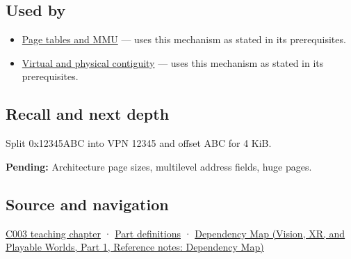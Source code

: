 \subsection{Used by}\label{appendix-0c67cd5bf30a-used-by}

\hypertarget{appendix-0c67cd5bf30a-used-by}{}

\begin{itemize}
\tightlist
\item
  \hyperref[appendix-01e5905165c4]{Page tables and MMU} --- uses this mechanism as stated in its prerequisites.
\item
  \hyperref[appendix-f897c1ddac8f]{Virtual and physical contiguity} --- uses this mechanism as stated in its prerequisites.
\end{itemize}

\subsection{Recall and next depth}\label{appendix-0c67cd5bf30a-recall-and-next-depth}

\hypertarget{appendix-0c67cd5bf30a-recall-and-next-depth}{}

Split 0x12345ABC into VPN 12345 and offset ABC for 4 KiB.

\textbf{Pending:} Architecture page sizes, multilevel address fields, huge pages.

\subsection{Source and navigation}\label{appendix-0c67cd5bf30a-source-and-navigation}

\hypertarget{appendix-0c67cd5bf30a-source-and-navigation}{}

\hyperref[01-foundations-i-ch002-where-the-bytes-live]{C003 teaching chapter} · \hyperref[appendix-fd090d982a15-m003---parts-41-60]{Part definitions} · \href{../07-Vision-XR-and-Playable-Worlds-P01/main.pdf\#appendix-4ad47bdd269a}{Dependency Map (Vision, XR, and Playable Worlds, Part 1, Reference notes: Dependency Map)}
